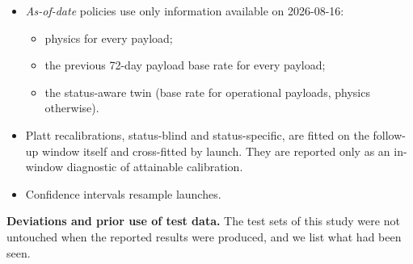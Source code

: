 \documentclass[
]{article}
\providecommand{\tightlist}{%
  \setlength{\itemsep}{0pt}\setlength{\parskip}{0pt}}
\begin{document}
\begin{itemize}
\tightlist
\item
  \emph{As-of-date} policies use only information available on
  2026-08-16:

  \begin{itemize}
  \tightlist
  \item
    physics for every payload;
  \item
    the previous 72-day payload base rate for every payload;
  \item
    the status-aware twin (base rate for operational payloads, physics
    otherwise).
  \end{itemize}
\item
  Platt recalibrations, status-blind and status-specific, are fitted on
  the follow-up window itself and cross-fitted by launch. They are
  reported only as an in-window diagnostic of attainable calibration.
\item
  Confidence intervals resample launches.
\end{itemize}

\textbf{Deviations and prior use of test data.} The test sets of this
study were not untouched when the reported results were produced, and we
list what had been seen.
\end{document}
